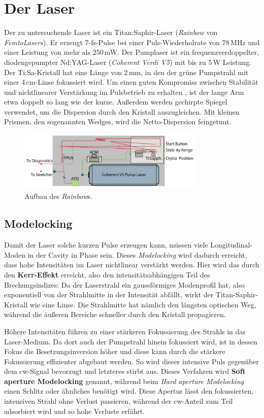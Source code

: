 \documentclass[bachelor,       %
               twoside,        %
               BCOR10mm,       %
               english,ngerman, %
               ]{GAUBM}
\begin{document}
\section{Der Laser}
Der zu untersuchende Laser ist ein Titan:Saphir-Laser (\textit{Rainbow} von \textit{FemtoLasers}).
Er erzeugt 7-fs-Pulse bei einer Puls-Wiederholrate von $78\,$MHz und einer Leistung von mehr als $250\,$mW.
Der Pumplaser ist ein frequenzverdoppelter, diodengepumpter Nd:YAG-Laser (\textit{Coherent Verdi V5}) mit bis zu 5\,W Leistung.
Der Ti:Sa-Kristall hat eine Länge von 2\,mm, in den der grüne Pumpstrahl mit einer 4\,cm-Linse fokussiert wird.
Um einen guten Kompromiss zwischen Stabilität und nichtlinearer Verstärkung im Pulsbetrieb zu erhalten \cite{stingl_sub-10-fs_1995}, ist der lange Arm etwa doppelt so lang wie der kurze.
Außerdem werden gechirpte Spiegel verwendet, um die Dispersion durch den Kristall auszugleichen.
Mit kleinen Prismen, den sogenannten Wedges, wird die Netto-Dispersion feingetunt.
\begin{figure}[!htb]
	\centering
	\includegraphics[width=0.8\textwidth]{figures/rainbow.png}
	\caption{Aufbau des \textit{Rainbow}s.}
	\label{fig:rainbow}
\end{figure}
\subsection{Modelocking}
Damit der Laser solche kurzen Pulse erzeugen kann, müssen viele Longitudinal-Moden in der Cavity in Phase sein.
Dieses \emph{Modelocking} wird dadurch erreicht, dass hohe Intensitäten im Laser nichtlinear verstärkt werden.
Hier wird das durch den \textbf{Kerr-Effekt} erreicht, also den intensitätsabhängigen Teil des Brechungsindizes: 
Da der Laserstrahl ein gaussförmiges Modenprofil hat, also exponentiell von der Strahlmitte in der Intensität abfällt, wirkt der Titan-Saphir-Kristall wie eine Linse.
Die Strahlmitte hat nämlich den längsten optischen Weg, während die äußeren Bereiche schneller durch den Kristall propagieren.

Höhere Intensitäten führen zu einer stärkeren Fokussierung des Strahls in das Laser-Medium.
Da dort auch der Pumpstrahl hinein fokussiert wird, ist in dessen Fokus die Besetzungsinversion höher und diese kann durch die stärkere Fokussierung effizienter abgebaut werden.
So wird dieser intensive Puls gegenüber dem cw-Signal bevorzugt und letzteres stirbt aus.
Dieses Verfahren wird \textbf{Soft aperture Modelocking} genannt, während beim \textit{Hard aperture Modelocking} einen Schlitz oder ähnliches benötigt wird.
Diese Apertur lässt den fokussierten, intensiven Strahl ohne Verlust passieren, während der cw-Anteil zum Teil adsorbiert wird und so hohe Verluste erfährt.
\end{document}
